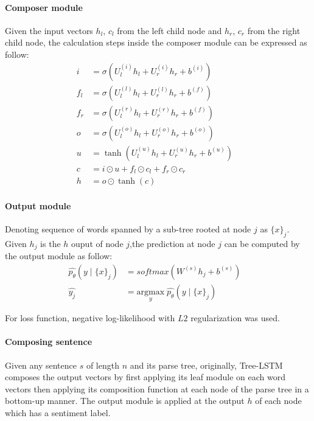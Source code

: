 \paragraph{Composer module}
Given the input vectors \({h_l}\), \({c_l}\) from the left child node and \({h_r}\), \({c_r}\) from the right child node, the calculation steps inside the composer module can be expressed as follow:
\begin{align}
      i &= \sigma{ \left(U_l^{(i)} h_{l} + U_r^{(i)} h_{r} + b^{(i)} \right) } &\\
      f_{l} &= \sigma{\left(U_{l}^{(l)} h_{l} + U_{r}^{(l)} h_{r} + b^{(f)}\right)} & \\
      f_{r} &= \sigma{\left(U_{l}^{(r)} h_{l} + U_{r}^{(r)} h_{r} + b^{(f)}\right)} & \\
      o &= \sigma{\left( U_l^{(o)} h_{l} + U_r^{(o)} h_{r} + b^{(o)}\right)} &\\
      u &= \tanh{\left( U_l^{(u)} h_{l} + U_r^{(u)} h_{r} + b^{(u)}\right)} &\\
       c &= i \odot u + f_{l} \odot c_{l} + f_{r} \odot c_{r} & \\
    h &= o \odot \tanh{\left(c\right)} &
\end{align}

\paragraph{Output module} Denoting sequence of words spanned by a sub-tree rooted at node \({j}\) as \({\{x\}_j}\).
Given \({h_j}\) is the \({h}\) ouput of node \({j}\),the prediction at node \({j}\) can be computed by the output module as follow:
\begin{align}
      \hat{p_{\theta}}(y \mid \{x\}_j ) &= softmax( W^{(s)} h_j + b^{(s)}) & \\
      \hat{y_j} &= \underset{y}{\mathrm{argmax}} \; \hat{p_{\theta}}(y \mid \{x\}_j ) &
\end{align}

For loss function, negative log-likelihood with \(L2\) regularization was used.

\paragraph{Composing sentence}
Given any sentence \({s}\) of length \({n}\) and its parse tree, originally, Tree-LSTM composes the output vectors by first applying its leaf module on each word vectors then applying its composition function at each node of the parse tree in a bottom-up manner.
The output module is applied at the output \({h}\) of each node which has a sentiment label.


